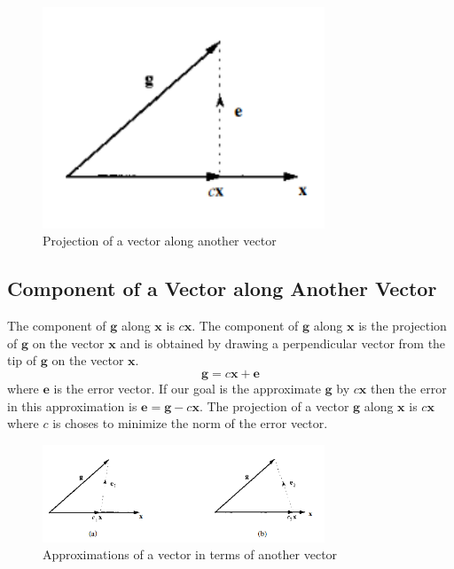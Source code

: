 \documentclass{article}
\begin{document}
    \begin{figure}[h]
        \centering
        \includegraphics[width=0.75\textwidth]{vec}
        \caption{Projection of a vector along another vector}
    \end{figure}

    \subsection{Component of a Vector along Another Vector}
    The component of $\textbf{g}$ along $\textbf{x}$ is $c\textbf{x}$. The component of $\textbf{g}$ along $\textbf{x}$ is the projection of
    $\textbf{g}$ on the vector $\textbf{x}$ and is obtained by drawing a perpendicular vector from the tip of $\textbf{g}$ on the vector $\textbf{x}$. 
    \begin{equation}
        \textbf{g} = c\textbf{x} + \textbf{e}
    \end{equation}
    where $\textbf{e}$ is the error vector. If our goal is the approximate $\textbf{g}$ by $c\textbf{x}$ then the error in this approximation is 
    $\textbf{e} = \textbf{g} - c\textbf{x}$. The projection of a vector $\textbf{g}$ along $\textbf{x}$ is $c\textbf{x}$ where $c$ is choses to 
    minimize the norm of the error vector.

    \begin{figure}[h]
        \centering
        \includegraphics[width=0.75\textwidth]{proj}
        \caption{Approximations of a vector in terms of another vector}
    \end{figure}
\end{document}
